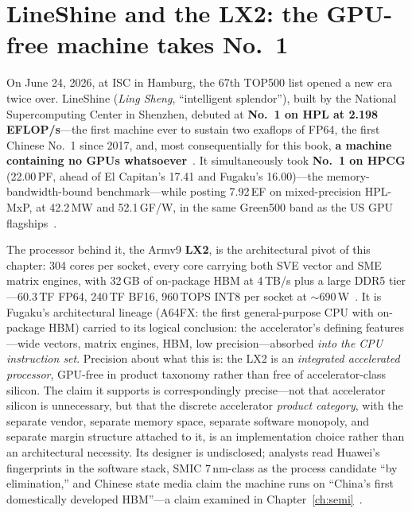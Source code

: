 \section{LineShine and the LX2: the GPU-free machine takes No.~1}
\label{sec:lineshine}

On June 24, 2026, at ISC in Hamburg, the 67th TOP500 list opened a new era twice over. LineShine (\emph{Ling Sheng}, ``intelligent splendor''), built by the National Supercomputing Center in Shenzhen, debuted at \textbf{No.~1 on HPL at 2.198\,EFLOP/s}---the first machine ever to sustain two exaflops of FP64, the first Chinese No.~1 since 2017, and, most consequentially for this book, \textbf{a machine containing no GPUs whatsoever}~\cite{top500-lineshine,dongarra-report}. It simultaneously took \textbf{No.~1 on HPCG} (22.00\,PF, ahead of El Capitan's 17.41 and Fugaku's 16.00)---the memory-bandwidth-bound benchmark---while posting 7.92\,EF on mixed-precision HPL-MxP, at 42.2\,MW and 52.1\,GF/W, in the same Green500 band as the US GPU flagships~\cite{top500-lineshine,dhm-long}.

The processor behind it, the Armv9 \textbf{LX2}, is the architectural pivot of this chapter: 304 cores per socket, every core carrying both SVE vector and SME matrix engines, with 32\,GB of on-package HBM at 4\,TB/s plus a large DDR5 tier---60.3\,TF FP64, 240\,TF BF16, 960\,TOPS INT8 per socket at $\sim$690\,W~\cite{dongarra-report,dhm-long}. It is Fugaku's architectural lineage (A64FX: the first general-purpose CPU with on-package HBM) carried to its logical conclusion: the accelerator's defining features---wide vectors, matrix engines, HBM, low precision---absorbed \emph{into the CPU instruction set}. Precision about what this is: the LX2 is an \emph{integrated accelerated processor}, GPU-free in product taxonomy rather than free of accelerator-class silicon. The claim it supports is correspondingly precise---not that accelerator silicon is unnecessary, but that the discrete accelerator \emph{product category}, with the separate vendor, separate memory space, separate software monopoly, and separate margin structure attached to it, is an implementation choice rather than an architectural necessity. Its designer is undisclosed; analysts read Huawei's fingerprints in the software stack, SMIC 7\,nm-class as the process candidate ``by elimination,'' and Chinese state media claim the machine runs on ``China's first domestically developed HBM''---a claim examined in Chapter~\ref{ch:semi}~\cite{lockwood,globaltimes-lineshine}.

